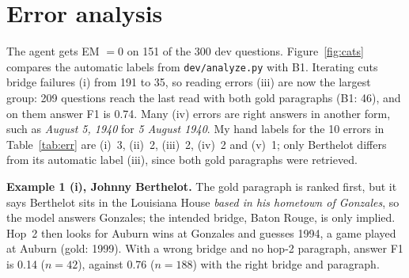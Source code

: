 \documentclass[10pt,a4paper]{article}
\begin{document}
\vfill
\newpage
\section{Error analysis}
\noindent\begin{minipage}[t]{0.50\textwidth}
\vspace{0pt}
The agent gets EM $=0$ on 151 of the 300 dev questions. Figure~\ref{fig:cats} compares the automatic labels from
\texttt{dev/analyze.py} with B1. Iterating cuts bridge failures (i) from 191 to 35, so reading errors (iii) are now
the largest group: 209 questions reach the last read with both gold paragraphs (B1: 46), and on them answer F1 is
0.74. Many (iv) errors are right answers in another form, such as \emph{August 5, 1940} for \emph{5 August 1940}.
My hand labels for the 10 errors in Table~\ref{tab:err} are (i)~3, (ii)~2, (iii)~2, (iv)~2 and (v)~1; only
Berthelot differs from its automatic label (iii), since both gold paragraphs were retrieved.
\end{minipage}\hfill
\begin{minipage}[t]{0.46\textwidth}
\vspace{0pt}
\centering
{}
\label{fig:cats}
\end{minipage}

\vfill
\textbf{Example 1 (i), Johnny Berthelot.} The gold paragraph is ranked first, but it says Berthelot sits in the
Louisiana House \emph{based in his hometown of Gonzales}, so the model answers Gonzales; the intended bridge, Baton
Rouge, is only implied. Hop~2 then looks for Auburn wins at Gonzales and guesses 1994, a game played at Auburn
(gold: 1999). With a wrong bridge and no hop-2 paragraph, answer F1 is 0.14 ($n{=}42$), against 0.76 ($n{=}188$)
with the right bridge and paragraph.
\end{document}
